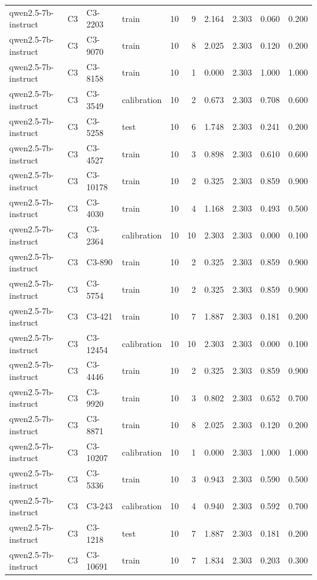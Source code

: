 \begin{table}
\begin{tabular}{llllrrrrrr}
qwen2.5-7b-instruct & C3 & C3-2203 & train & 10 & 9 & 2.164 & 2.303 & 0.060 & 0.200 \\
qwen2.5-7b-instruct & C3 & C3-9070 & train & 10 & 8 & 2.025 & 2.303 & 0.120 & 0.200 \\
qwen2.5-7b-instruct & C3 & C3-8158 & train & 10 & 1 & 0.000 & 2.303 & 1.000 & 1.000 \\
qwen2.5-7b-instruct & C3 & C3-3549 & calibration & 10 & 2 & 0.673 & 2.303 & 0.708 & 0.600 \\
qwen2.5-7b-instruct & C3 & C3-5258 & test & 10 & 6 & 1.748 & 2.303 & 0.241 & 0.200 \\
qwen2.5-7b-instruct & C3 & C3-4527 & train & 10 & 3 & 0.898 & 2.303 & 0.610 & 0.600 \\
qwen2.5-7b-instruct & C3 & C3-10178 & train & 10 & 2 & 0.325 & 2.303 & 0.859 & 0.900 \\
qwen2.5-7b-instruct & C3 & C3-4030 & train & 10 & 4 & 1.168 & 2.303 & 0.493 & 0.500 \\
qwen2.5-7b-instruct & C3 & C3-2364 & calibration & 10 & 10 & 2.303 & 2.303 & 0.000 & 0.100 \\
qwen2.5-7b-instruct & C3 & C3-890 & train & 10 & 2 & 0.325 & 2.303 & 0.859 & 0.900 \\
qwen2.5-7b-instruct & C3 & C3-5754 & train & 10 & 2 & 0.325 & 2.303 & 0.859 & 0.900 \\
qwen2.5-7b-instruct & C3 & C3-421 & train & 10 & 7 & 1.887 & 2.303 & 0.181 & 0.200 \\
qwen2.5-7b-instruct & C3 & C3-12454 & calibration & 10 & 10 & 2.303 & 2.303 & 0.000 & 0.100 \\
qwen2.5-7b-instruct & C3 & C3-4446 & train & 10 & 2 & 0.325 & 2.303 & 0.859 & 0.900 \\
qwen2.5-7b-instruct & C3 & C3-9920 & train & 10 & 3 & 0.802 & 2.303 & 0.652 & 0.700 \\
qwen2.5-7b-instruct & C3 & C3-8871 & train & 10 & 8 & 2.025 & 2.303 & 0.120 & 0.200 \\
qwen2.5-7b-instruct & C3 & C3-10207 & calibration & 10 & 1 & 0.000 & 2.303 & 1.000 & 1.000 \\
qwen2.5-7b-instruct & C3 & C3-5336 & train & 10 & 3 & 0.943 & 2.303 & 0.590 & 0.500 \\
qwen2.5-7b-instruct & C3 & C3-243 & calibration & 10 & 4 & 0.940 & 2.303 & 0.592 & 0.700 \\
qwen2.5-7b-instruct & C3 & C3-1218 & test & 10 & 7 & 1.887 & 2.303 & 0.181 & 0.200 \\
qwen2.5-7b-instruct & C3 & C3-10691 & train & 10 & 7 & 1.834 & 2.303 & 0.203 & 0.300 \\

\end{tabular}
\end{table}
